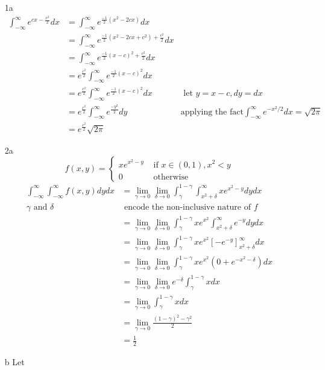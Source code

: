 \documentclass[12pt, letterpaper]{article}
\begin{document}
\begin{enumerate}
	\item[1a]
	\begin{align*}
		\int_{-\infty}^\infty e^{cx-\frac{x^2}{2}}dx &= \int_{-\infty}^\infty e^{\frac{-1}{2}(x^2-2cx)}dx\\
		&= \int_{-\infty}^\infty e^{\frac{-1}{2}(x^2-2cx+c^2)+\frac{c^2}{2}}dx\\
		&= \int_{-\infty}^\infty e^{\frac{-1}{2}(x-c)^2+\frac{c^2}{2}}dx\\
		&= e^\frac{c^2}{2}\int_{-\infty}^\infty e^{\frac{-1}{2}(x-c)^2}dx\\
		&= e^\frac{c^2}{2}\int_{-\infty}^\infty e^{\frac{-1}{2}(x-c)^2}dx & \text{ let } y=x-c, dy = dx\\
		&= e^\frac{c^2}{2}\int_{-\infty}^\infty e^{\frac{-y^2}{2}}dy & \text{applying the fact} \int_{-\infty}^\infty e^{-x^2/2}dx = \sqrt{2\pi}\\
		&= e^\frac{c^2}{2}\sqrt{2\pi}
	\end{align*}
	\item[2a] 
	$$
	f(x,y) = \begin{cases}
		xe^{x^2-y} & \text{ if } x \in (0,1), x^2 < y\\
		0 & \text{ otherwise}	
	\end{cases}
	$$
		\begin{align*}
			\int_{-\infty}^\infty \int_{-\infty}^\infty f(x,y) dy dx &= \lim_{\gamma \to 0} \lim_{\delta \to 0} \int_\gamma^{1-\gamma}\int_{x^2+\delta}^\infty xe^{x^2-y} dy dx\\
			 \gamma \text{ and } \delta & \text{ encode the non-inclusive nature of } f\\
			 &= \lim_{\gamma \to 0} \lim_{\delta \to 0} \int_\gamma^{1-\gamma}xe^{x^2} \int_{x^2+\delta}^\infty e^{-y} dy dx\\
			 &= \lim_{\gamma \to 0} \lim_{\delta \to 0} \int_\gamma^{1-\gamma}xe^{x^2} [-e^{-y}]_{x^2+\delta}^\infty dx\\
			 &= \lim_{\gamma \to 0} \lim_{\delta \to 0} \int_\gamma^{1-\gamma}xe^{x^2} (0+e^{-x^2-\delta}) dx\\
			 &= \lim_{\gamma \to 0} \lim_{\delta \to 0} e^{-\delta}  \int_\gamma^{1-\gamma}xdx\\
			 &= \lim_{\gamma \to 0} \int_\gamma^{1-\gamma}xdx\\
			 &= \lim_{\gamma \to 0} \frac{(1-\gamma)^2 - \gamma^2}{2}\\
			 &= \frac{1}{2}
		\end{align*}
	\item[b]
	Let \begin{align*}

\end{align*}
\end{enumerate}
\end{document}
